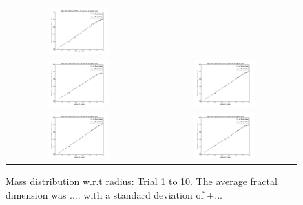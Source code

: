 \documentclass[a4paper,12pt]{article}
\begin{document}
\begin{figure}[htb]
\begin{tabular}{@{}cc@{}}
		\includegraphics[width = 0.45\textwidth]{pics/Fractal_dimension_final_6.pdf} \\
		\includegraphics[width = 0.45\textwidth]{pics/Fractal_dimension_final_7.pdf} &
		\includegraphics[width = 0.45\textwidth]{pics/Fractal_dimension_final_8.pdf} \\
		\includegraphics[width = 0.45\textwidth]{pics/Fractal_dimension_final_9.pdf} &
		\includegraphics[width = 0.45\textwidth]{pics/Fractal_dimension_final_10.pdf} \\
	\end{tabular}
	\caption{Mass distribution w.r.t radius: Trial 1 to 10. The average fractal dimension was .... with a standard deviation of $\pm...$}
	\label{FractalDimension}
\end{figure}
\end{document}
